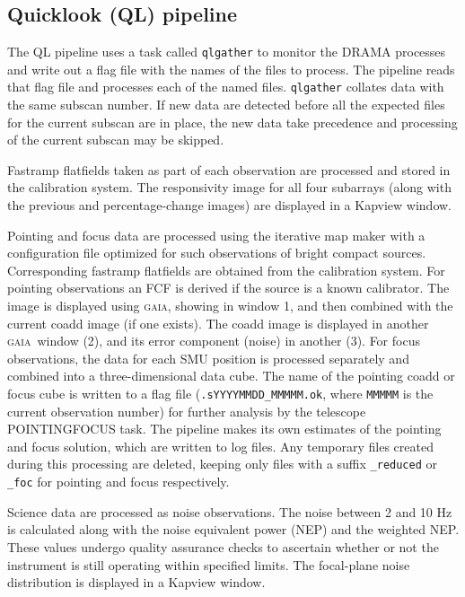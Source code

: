 \documentclass[twoside,11pt]{article}
\renewcommand{\_}{\texttt{\symbol{95}}}
\newcommand{\GAIA}{\textsc{gaia}}
\begin{document}
\subsection{Quicklook (QL) pipeline}

The QL pipeline uses a task called \verb+qlgather+ to monitor the
DRAMA processes and write out a flag file with the names of the files
to process. The pipeline reads that flag file and processes each of
the named files. \verb+qlgather+ collates data with the same subscan
number. If new data are detected before all the expected files for
the current subscan are in place, the new data take precedence and
processing of the current subscan may be skipped.

Fastramp flatfields taken as part of each observation are processed
and stored in the calibration system. The responsivity image for all
four subarrays (along with the previous and percentage-change images)
are displayed in a Kapview window.

Pointing and focus data are processed using the iterative map maker
with a configuration file optimized for such observations of bright
compact sources. Corresponding fastramp flatfields are obtained from
the calibration system. For pointing observations an FCF is derived if
the source is a known calibrator. The image is displayed using \GAIA,
showing in window 1, and then combined with the current coadd image
(if one exists). The coadd image is displayed in another \GAIA\ window
(2), and its error component (noise) in another (3). For focus
observations, the data for each SMU position is processed separately
and combined into a three-dimensional data cube. The name of the
pointing coadd or focus cube is written to a flag file
(\verb+.sYYYYMMDD_MMMMM.ok+, where \verb+MMMMM+ is the current
observation number) for further analysis by the telescope
POINTING\_FOCUS task. The pipeline makes its own estimates of the
pointing and focus solution, which are written to log files. Any
temporary files created during this processing are deleted, keeping
only files with a suffix \verb+_reduced+ or \verb+_foc+ for pointing
and focus respectively.

Science data are processed as noise observations. The noise between 2
and 10 Hz is calculated along with the noise equivalent power (NEP)
and the weighted NEP. These values undergo quality assurance checks to
ascertain whether or not the instrument is still operating within
specified limits. The focal-plane noise distribution is displayed in a
Kapview window.
\end{document}
